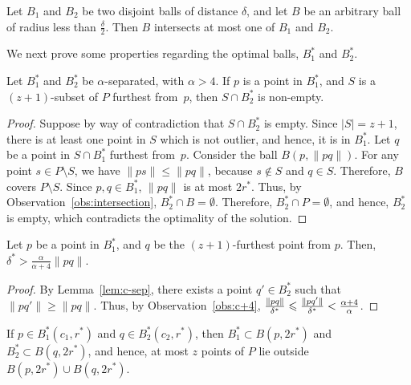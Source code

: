 \documentclass[envcountsame]{cls/cccg15}
\newcommand{\card}[1]{\left|{#1}\right|}
\newcommand{\len}[1]{\|{#1}\|}
\newcommand{\lee}{\leqslant}
\newcommand{\gee}{\geqslant}
\renewcommand{\leq}{\lee}
\renewcommand{\le}{\lee}
\renewcommand{\ge}{\gee}
\begin{document}
\begin{obs}
\label{obs:intersection}
	Let $B_1$ and $B_2$ be two disjoint balls of distance $\delta$,
	and let $B$ be an arbitrary ball of radius less than $\frac{\delta}{2}$. 
	Then $B$ intersects at most one of $B_1$ and $B_2$.
\end{obs}

\noindent 
We next prove some properties regarding 
the optimal balls, $B_1^*$ and $B_2^*$.

\begin{lemma}
\label{lem:c-sep}
	Let $B_1^*$ and $B_2^*$ be $\alpha$-separated, with $\alpha > 4$.
	If $p$ is a point in $B_1^*$,
	and $S$ is a $(z+1)$-subset of $P$ furthest from~$p$,
	then $S \cap B_2^*$ is non-empty.
\end{lemma}

\begin{proof}
Suppose by way of contradiction that $S \cap B_2^*$ is empty. 
Since $\card{S} = z + 1$, there is at least one point in $S$
which is not outlier, and hence, it is in $B_1^*$.
Let $q$ be a point in $S \cap B_1^*$ furthest from~$p$. 
Consider the ball $B(p, \len{pq})$. 
For any point $s \in P \setminus S$, 
we have $\len{ps} \leq \len{pq}$,
because $s \not\in S$ and $q \in S$. 
Therefore, $B$ covers $P \setminus S$.
Since $p, q \in B_1^*$, $\len{pq}$ is at most $2r^*$. 
Thus, by Observation~\ref{obs:intersection}, $B_2^* \cap B = \emptyset$. 
Therefore, $B_2^* \cap P = \emptyset$, and hence,
 $B_2^*$ is empty, which contradicts the optimality of the solution.
\end{proof}

\begin{lemma}
\label{lem:(z+1)-furthest}
	Let $p$ be a point in $B_1^{*}$,
	and $q$ be the $(z+1)$-furthest point from $p$. 
	Then, $\delta^* > \frac{\alpha}{\alpha+4}\len{pq}$.
\end{lemma}

\begin{proof}
By Lemma~\ref{lem:c-sep}, there exists a point $q' \in B_2^*$ 
such that $\len{pq'} \ge \len{pq}$. 
Thus, by Observation~\ref{obs:c+4}, 
${\len{pq} \over \delta^*} \le {\len{pq'} \over \delta^*} < \frac{\alpha+4}{\alpha}$.
\end{proof}

\begin{lemma}
\label{lem:2r}
	If $p \in B_1^*(c_1, r^*)$ and $q \in B_2^*(c_2, r^*)$,
	then $B_1^* \subset B(p, 2r^*)$ and $B_2^* \subset B(q, 2r^*)$,
	and hence, at most $z$ points of $P$ lie outside $B(p, 2r^*) \cup B(q, 2r^*)$.
\end{lemma}
\end{document}
